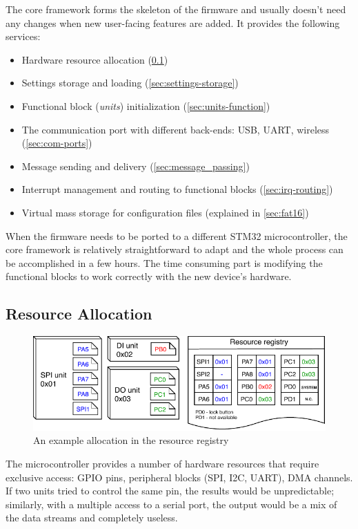 The core framework forms the skeleton of the firmware and usually doesn't need any changes when new user-facing features are added. It provides the following services:

\begin{itemize}
	\item Hardware resource allocation (\cref{sec:res-allocation})
	\item Settings storage and loading (\cref{sec:settings-storage})
	\item Functional block (\textit{units}) initialization (\cref{sec:units-function})
	\item The communication port with different back-ends: \gls{USB}, \gls{UART}, wireless (\cref{sec:com-ports})
	\item Message sending and delivery (\cref{sec:message_passing})
	\item Interrupt management and routing to functional blocks (\cref{sec:irq-routing})
	\item Virtual mass storage for configuration files (explained in \cref{sec:fat16})
\end{itemize}

When the firmware needs to be ported to a different STM32 microcontroller, the core framework is relatively straightforward to adapt and the whole process can be accomplished in a few hours. The time consuming part is modifying the functional blocks to work correctly with the new device's hardware.


\subsection{Resource Allocation} \label{sec:res-allocation}

\begin{figure}[h]
	\centering
	\includegraphics[scale=1] {img/resource-repository.pdf}
	\caption{\label{fig:resource-repository}An example allocation in the resource registry}
\end{figure}

The microcontroller provides a number of hardware resources that require exclusive access: GPIO pins, peripheral blocks (\gls{SPI}, \gls{I2C}, \gls{UART}\textellipsis), \gls{DMA} channels. If two units tried to control the same pin, the results would be unpredictable; similarly, with a multiple access to a serial port, the output would be a mix of the data streams and completely useless.


